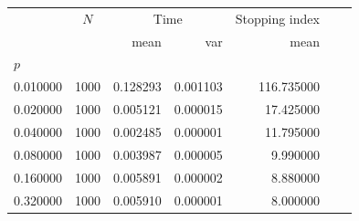 \begin{tabular}{lrrrrrr}
\toprule
 & \multicolumn{1}{c}{$N$} & \multicolumn{2}{c}{Time} & \multicolumn{1}{c}{Stopping index} \\
 &  & mean & var & mean \\
$p$ &  &  &  &  &  &  \\
\midrule
0.010000 & 1000  & 0.128293 & 0.001103 & 116.735000  \\
0.020000 & 1000  & 0.005121 & 0.000015 & 17.425000  \\
0.040000 & 1000  & 0.002485 & 0.000001 & 11.795000  \\
0.080000 & 1000  & 0.003987 & 0.000005 & 9.990000  \\
0.160000 & 1000  & 0.005891 & 0.000002 & 8.880000  \\
0.320000 & 1000  & 0.005910 & 0.000001 & 8.000000  \\
\bottomrule
\end{tabular}

